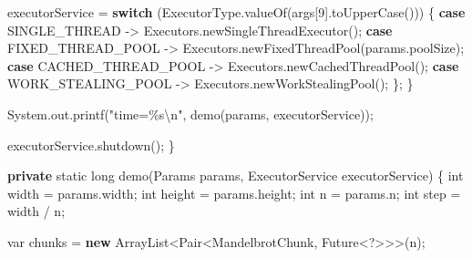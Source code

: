 \documentclass[11pt]{article}
\newenvironment{Shaded}{}{}
\newcommand{\KeywordTok}[1]{\textcolor[rgb]{0.00,0.44,0.13}{\textbf{{#1}}}}
\newcommand{\DataTypeTok}[1]{\textcolor[rgb]{0.56,0.13,0.00}{{#1}}}
\newcommand{\DecValTok}[1]{\textcolor[rgb]{0.25,0.63,0.44}{{#1}}}
\newcommand{\StringTok}[1]{\textcolor[rgb]{0.25,0.44,0.63}{{#1}}}
\newcommand{\FunctionTok}[1]{\textcolor[rgb]{0.02,0.16,0.49}{{#1}}}
\newcommand{\NormalTok}[1]{{#1}}
\newcommand{\SpecialCharTok}[1]{\textcolor[rgb]{0.25,0.44,0.63}{{#1}}}
\newcommand{\ControlFlowTok}[1]{\textcolor[rgb]{0.00,0.44,0.13}{\textbf{{#1}}}}
\newcommand{\OperatorTok}[1]{\textcolor[rgb]{0.40,0.40,0.40}{{#1}}}
\newcommand{\BuiltInTok}[1]{{#1}}
\begin{document}
\begin{Shaded}
\begin{Highlighting}[]
\NormalTok{            executorService }\OperatorTok{=} \ControlFlowTok{switch} \OperatorTok{(}\NormalTok{ExecutorType}\OperatorTok{.}\FunctionTok{valueOf}\OperatorTok{(}\NormalTok{args}\OperatorTok{[}\DecValTok{9}\OperatorTok{].}\FunctionTok{toUpperCase}\OperatorTok{()))} \OperatorTok{\{}
                \ControlFlowTok{case}\NormalTok{ SINGLE\_THREAD }\OperatorTok{{-}\textgreater{}} \BuiltInTok{Executors}\OperatorTok{.}\FunctionTok{newSingleThreadExecutor}\OperatorTok{();}
                \ControlFlowTok{case}\NormalTok{ FIXED\_THREAD\_POOL }\OperatorTok{{-}\textgreater{}} \BuiltInTok{Executors}\OperatorTok{.}\FunctionTok{newFixedThreadPool}\OperatorTok{(}\NormalTok{params}\OperatorTok{.}\FunctionTok{poolSize}\OperatorTok{);}
                \ControlFlowTok{case}\NormalTok{ CACHED\_THREAD\_POOL }\OperatorTok{{-}\textgreater{}} \BuiltInTok{Executors}\OperatorTok{.}\FunctionTok{newCachedThreadPool}\OperatorTok{();}
                \ControlFlowTok{case}\NormalTok{ WORK\_STEALING\_POOL }\OperatorTok{{-}\textgreater{}} \BuiltInTok{Executors}\OperatorTok{.}\FunctionTok{newWorkStealingPool}\OperatorTok{();}
            \OperatorTok{\};}
        \OperatorTok{\}}

        \BuiltInTok{System}\OperatorTok{.}\FunctionTok{out}\OperatorTok{.}\FunctionTok{printf}\OperatorTok{(}\StringTok{"time=}\SpecialCharTok{\%s\textbackslash{}n}\StringTok{"}\OperatorTok{,} \FunctionTok{demo}\OperatorTok{(}\NormalTok{params}\OperatorTok{,}\NormalTok{ executorService}\OperatorTok{));}

\NormalTok{        executorService}\OperatorTok{.}\FunctionTok{shutdown}\OperatorTok{();}
    \OperatorTok{\}}

    \KeywordTok{private} \DataTypeTok{static} \DataTypeTok{long} \FunctionTok{demo}\OperatorTok{(}\NormalTok{Params params}\OperatorTok{,} \BuiltInTok{ExecutorService}\NormalTok{ executorService}\OperatorTok{)} \OperatorTok{\{}
        \DataTypeTok{int}\NormalTok{ width }\OperatorTok{=}\NormalTok{ params}\OperatorTok{.}\FunctionTok{width}\OperatorTok{;}
        \DataTypeTok{int}\NormalTok{ height }\OperatorTok{=}\NormalTok{ params}\OperatorTok{.}\FunctionTok{height}\OperatorTok{;}
        \DataTypeTok{int}\NormalTok{ n }\OperatorTok{=}\NormalTok{ params}\OperatorTok{.}\FunctionTok{n}\OperatorTok{;}
        \DataTypeTok{int}\NormalTok{ step }\OperatorTok{=}\NormalTok{ width }\OperatorTok{/}\NormalTok{ n}\OperatorTok{;}

        \DataTypeTok{var}\NormalTok{ chunks }\OperatorTok{=} \KeywordTok{new} \BuiltInTok{ArrayList}\OperatorTok{\textless{}}\NormalTok{Pair}\OperatorTok{\textless{}}\NormalTok{MandelbrotChunk}\OperatorTok{,} \BuiltInTok{Future}\OperatorTok{\textless{}?\textgreater{}\textgreater{}\textgreater{}(}\NormalTok{n}\OperatorTok{);}


\end{Highlighting}
\end{Shaded}
\end{document}
